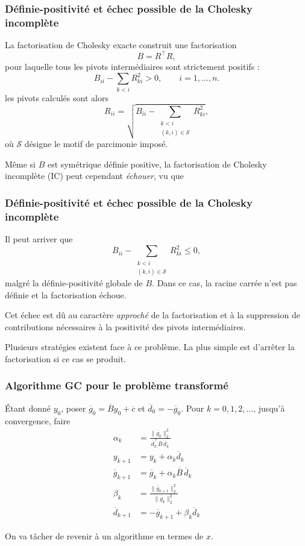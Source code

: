\documentclass[usepdftitle=false,aspectratio=169]{beamer}
\begin{document}
\begin{frame}
\frametitle{Définie-positivité et échec possible de la Cholesky incomplète}

La factorisation de Cholesky exacte construit une factorisation
\[
B = R^\top R,
\]
pour laquelle tous les pivots intermédiaires sont strictement positifs :
\[
B_{ii} - \sum_{k<i} R_{k i}^2 > 0,
\qquad i = 1,\dots,n.
\]
les pivots calculés sont alors
\[
R_{ii}
= \sqrt{
	B_{ii}
	- \sum_{\substack{k<i \\ (k,i)\in\mathcal S}} R_{k i}^2
},
\]
où $\mathcal S$ désigne le motif de parcimonie imposé.

Même si $B$ est symétrique définie positive, la factorisation de Cholesky
incomplète (IC) peut cependant \emph{échouer}, vu que

\end{frame}

\begin{frame}
\frametitle{Définie-positivité et échec possible de la Cholesky incomplète}

Il peut arriver que
\[
B_{ii}
- \sum_{\substack{k<i \\ (k,i)\in\mathcal S}} R_{k i}^2
\le 0,
\]
malgré la définie-positivité globale de $B$. Dans ce cas, la racine carrée
n’est pas définie et la factorisation échoue.

\mbox{}

Cet échec est dû au caractère \emph{approché} de la factorisation et à la
suppression de contributions nécessaires à la positivité des pivots
intermédiaires.

\mbox{}

Plusieurs stratégies existent face à ce problème. La plus simple est d'arrêter la factorisation si ce cas se produit.

\end{frame}

\begin{frame}
\frametitle{Algorithme GC pour le problème transformé}


Étant donné $y_0$, poser $\overline{g}_0 = \overline{B}y_0 + \overline{c}$ et $\overline{d}_0 = -\overline{g}_0$.
Pour $k = 0,1,2,\ldots$, jusqu'à convergence, faire
\begin{align*}
\alpha_k &= \frac{\| \overline{g}_k \|^2_2}{\overline{d}_k^\top\overline{B}\,\overline{d}_k} \\
y_{k+1} &= y_k + \alpha_k \overline{d}_k \\
\overline{g}_{k+1} &= \overline{g}_k + \alpha_k \overline{B}\, \overline{d}_k \\
\beta_k &= \frac{\| \overline{g}_{k+1} \|^2_2 }{ \| \overline{g}_k \|^2_2 } \\
\overline{d}_{k+1} &= -\overline{g}_{k+1} + \beta_k \overline{d}_k
\end{align*}

\mbox{}

On va tâcher de revenir à un algorithme en termes de $x$.

\end{frame}
\end{document}
